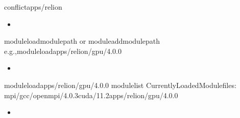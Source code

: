 \documentclass[a4paper,11pt,english]{sphinxmanual}
\begin{document}
\begin{sphinxVerbatim}[commandchars=\\\{\}]
conflictapps/relion
\PYGZhy{}\PYGZhy{}\PYGZhy{}\PYGZhy{}\PYGZhy{}\PYGZhy{}\PYGZhy{}\PYGZhy{}\PYGZhy{}\PYGZhy{}\PYGZhy{}\PYGZhy{}\PYGZhy{}\PYGZhy{}\PYGZhy{}\PYGZhy{}\PYGZhy{}\PYGZhy{}\PYGZhy{}\PYGZhy{}\PYGZhy{}\PYGZhy{}\PYGZhy{}\PYGZhy{}\PYGZhy{}\PYGZhy{}\PYGZhy{}\PYGZhy{}\PYGZhy{}\PYGZhy{}\PYGZhy{}\PYGZhy{}\PYGZhy{}\PYGZhy{}\PYGZhy{}\PYGZhy{}\PYGZhy{}\PYGZhy{}\PYGZhy{}\PYGZhy{}\PYGZhy{}\PYGZhy{}\PYGZhy{}\PYGZhy{}\PYGZhy{}\PYGZhy{}\PYGZhy{}\PYGZhy{}\PYGZhy{}\PYGZhy{}\PYGZhy{}\PYGZhy{}\PYGZhy{}\PYGZhy{}\PYGZhy{}\PYGZhy{}\PYGZhy{}\PYGZhy{}\PYGZhy{}\PYGZhy{}\PYGZhy{}\PYGZhy{}\PYGZhy{}\PYGZhy{}\PYGZhy{}\PYGZhy{}\PYGZhy{}
\end{sphinxVerbatim}
\begin{itemize}
\item {} 
\sphinxAtStartPar
{}

\end{itemize}

\begin{sphinxVerbatim}[commandchars=\\\{\}]
\PYGZdl{}\PYGZgt{}moduleload\PYGZlt{}module\PYGZus{}path\PYGZgt{}
or
\PYGZdl{}\PYGZgt{}moduleadd\PYGZlt{}module\PYGZus{}path\PYGZgt{}
e.g.,\PYGZdl{}\PYGZgt{}moduleloadapps/relion/gpu/4.0.0
\end{sphinxVerbatim}
\begin{itemize}
\item {} 
\sphinxAtStartPar
{}

\end{itemize}

\begin{sphinxVerbatim}[commandchars=\\\{\}]
\PYGZdl{}\PYGZgt{}moduleloadapps/relion/gpu/4.0.0
\PYGZdl{}\PYGZgt{}modulelist
CurrentlyLoadedModulefiles:
mpi/gcc/openmpi/4.0.3cuda/11.2apps/relion/gpu/4.0.0
\end{sphinxVerbatim}
\begin{itemize}
\item {} 
\sphinxAtStartPar
{}

\end{itemize}
\end{document}
